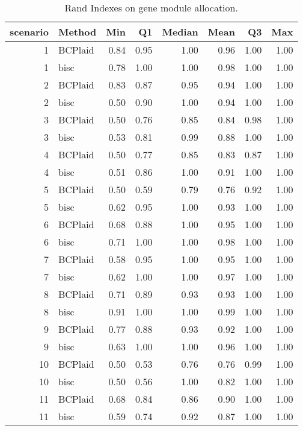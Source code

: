 \begin{table}[ht]
\caption{Rand Indexes on gene module allocation.}
\vspace{1.5cm}
\centering
\begin{tabular}{rlrrrrrr}
  \toprule
scenario & Method & Min & Q1 & Median & Mean & Q3 & Max \\ 
  \midrule
  1 & BCPlaid & 0.84 & 0.95 & 1.00 & 0.96 & 1.00 & 1.00 \\ 
    1 & bisc & 0.78 & 1.00 & 1.00 & 0.98 & 1.00 & 1.00 \\ 
    2 & BCPlaid & 0.83 & 0.87 & 0.95 & 0.94 & 1.00 & 1.00 \\ 
    2 & bisc & 0.50 & 0.90 & 1.00 & 0.94 & 1.00 & 1.00 \\ 
    3 & BCPlaid & 0.50 & 0.76 & 0.85 & 0.84 & 0.98 & 1.00 \\ 
    3 & bisc & 0.53 & 0.81 & 0.99 & 0.88 & 1.00 & 1.00 \\ 
    4 & BCPlaid & 0.50 & 0.77 & 0.85 & 0.83 & 0.87 & 1.00 \\ 
    4 & bisc & 0.51 & 0.86 & 1.00 & 0.91 & 1.00 & 1.00 \\ 
    5 & BCPlaid & 0.50 & 0.59 & 0.79 & 0.76 & 0.92 & 1.00 \\ 
    5 & bisc & 0.62 & 0.95 & 1.00 & 0.93 & 1.00 & 1.00 \\ 
    6 & BCPlaid & 0.68 & 0.88 & 1.00 & 0.95 & 1.00 & 1.00 \\ 
    6 & bisc & 0.71 & 1.00 & 1.00 & 0.98 & 1.00 & 1.00 \\ 
    7 & BCPlaid & 0.58 & 0.95 & 1.00 & 0.95 & 1.00 & 1.00 \\ 
    7 & bisc & 0.62 & 1.00 & 1.00 & 0.97 & 1.00 & 1.00 \\ 
    8 & BCPlaid & 0.71 & 0.89 & 0.93 & 0.93 & 1.00 & 1.00 \\ 
    8 & bisc & 0.91 & 1.00 & 1.00 & 0.99 & 1.00 & 1.00 \\ 
    9 & BCPlaid & 0.77 & 0.88 & 0.93 & 0.92 & 1.00 & 1.00 \\ 
    9 & bisc & 0.63 & 1.00 & 1.00 & 0.96 & 1.00 & 1.00 \\ 
   10 & BCPlaid & 0.50 & 0.53 & 0.76 & 0.76 & 0.99 & 1.00 \\ 
   10 & bisc & 0.50 & 0.56 & 1.00 & 0.82 & 1.00 & 1.00 \\ 
   11 & BCPlaid & 0.68 & 0.84 & 0.86 & 0.90 & 1.00 & 1.00 \\ 
   11 & bisc & 0.59 & 0.74 & 0.92 & 0.87 & 1.00 & 1.00 \\ 

\end{tabular}
\end{table}
